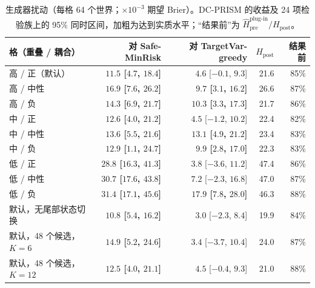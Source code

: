 \documentclass[runningheads]{llncs}
\begin{document}
\begin{table}[t]
\caption{生成器扰动（每格 64 个世界；$\times10^{-3}$ 期望 Brier）。DC-PRISM 的收益及 24 项检验族上的 95\% 同时区间，加粗为达到实质水平；“结果前”为 $\widehat H_{\mathrm{pre}}^{\text{plug-in}}/H_{\mathrm{post}}$。}
\label{tab:perturb}
\centering\scriptsize
\setlength{\tabcolsep}{3pt}
\begin{tabular}{lrrrr}
\toprule
格（重叠 / 耦合） & 对 Safe-MinRisk & 对 TargetVar-greedy & $H_{\mathrm{post}}$ & 结果前 \\
\midrule
高 / 正（默认） & {\bfseries\boldmath $11.5$ [$4.7$, $18.4$]} & $4.6$ [$-0.1$, $9.3$] & 21.6 & 85\% \\
高 / 中性 & {\bfseries\boldmath $16.9$ [$7.6$, $26.2$]} & {\bfseries\boldmath $9.7$ [$3.1$, $16.2$]} & 26.6 & 87\% \\
高 / 负 & {\bfseries\boldmath $14.3$ [$6.9$, $21.7$]} & {\bfseries\boldmath $10.3$ [$3.3$, $17.3$]} & 21.7 & 86\% \\
中 / 正 & {\bfseries\boldmath $12.6$ [$4.0$, $21.2$]} & $4.5$ [$-1.2$, $10.2$] & 22.4 & 82\% \\
中 / 中性 & {\bfseries\boldmath $13.6$ [$5.5$, $21.6$]} & {\bfseries\boldmath $13.1$ [$4.9$, $21.2$]} & 23.4 & 83\% \\
中 / 负 & {\bfseries\boldmath $12.9$ [$1.1$, $24.7$]} & {\bfseries\boldmath $9.9$ [$2.8$, $17.0$]} & 22.3 & 83\% \\
低 / 正 & {\bfseries\boldmath $28.8$ [$16.3$, $41.3$]} & $3.8$ [$-3.6$, $11.2$] & 47.4 & 86\% \\
低 / 中性 & {\bfseries\boldmath $30.7$ [$17.6$, $43.8$]} & $7.2$ [$-2.3$, $16.8$] & 47.0 & 87\% \\
低 / 负 & {\bfseries\boldmath $31.4$ [$17.1$, $45.6$]} & {\bfseries\boldmath $17.9$ [$7.8$, $28.0$]} & 46.3 & 88\% \\
默认，无尾部状态切换 & {\bfseries\boldmath $10.8$ [$5.4$, $16.2$]} & $3.0$ [$-2.3$, $8.4$] & 19.9 & 84\% \\
默认，48 个候选，$K=6$ & {\bfseries\boldmath $14.9$ [$5.2$, $24.6$]} & $3.4$ [$-3.7$, $10.4$] & 24.0 & 87\% \\
默认，48 个候选，$K=12$ & {\bfseries\boldmath $12.5$ [$4.0$, $21.1$]} & $4.5$ [$-0.4$, $9.3$] & 21.0 & 88\% \\
\bottomrule
\end{tabular}
\end{table}
\end{document}

